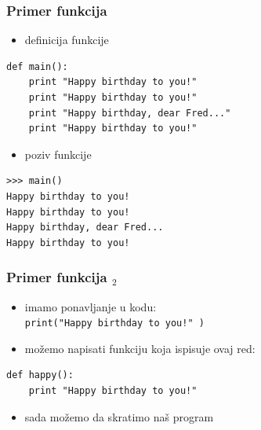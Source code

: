 \documentclass[compress]{beamer}
\begin{document}

\begin{frame}[fragile]
  \frametitle{Primer funkcija}
  \begin{itemize}
    \item definicija funkcije
  \end{itemize}
\begin{verbatim}
def main():
    print "Happy birthday to you!"
    print "Happy birthday to you!"
    print "Happy birthday, dear Fred..."
    print "Happy birthday to you!"
\end{verbatim}
  \begin{itemize}
    \item poziv funkcije
  \end{itemize}
\begin{verbatim}
>>> main()
Happy birthday to you!
Happy birthday to you!
Happy birthday, dear Fred...
Happy birthday to you!
\end{verbatim}
\end{frame}

\begin{frame}[fragile]
  \frametitle{Primer funkcija $_2$}
  \begin{itemize}
    \item imamo ponavljanje u kodu: \\
      \texttt{print("Happy birthday to you!" )}
    \item možemo napisati funkciju koja ispisuje ovaj red:
  \end{itemize}
\begin{verbatim}
def happy():
    print "Happy birthday to you!"
\end{verbatim}
  \begin{itemize}
    \item sada možemo da skratimo naš program
  \end{itemize}
\end{frame}
\end{document}
